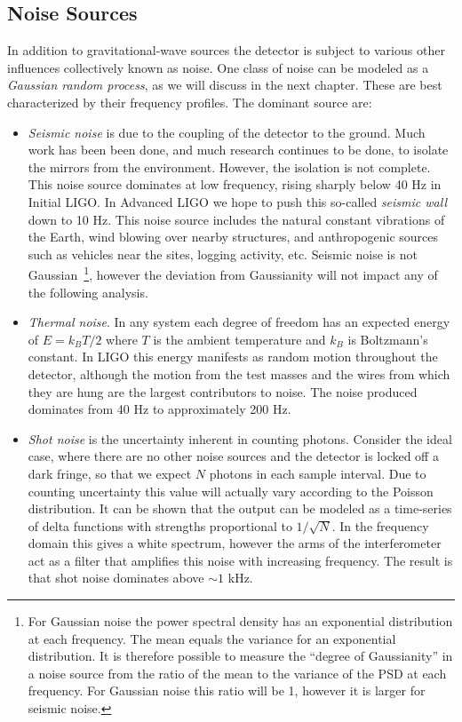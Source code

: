 \subsection{Noise Sources}
\label{sec:noise_sources}

In addition to gravitational-wave sources the detector is subject to
various other influences collectively known as noise.  One class of
noise can be modeled as a \emph{Gaussian random process}, as we will
discuss in the next chapter.  These are best characterized by their
frequency profiles.  The dominant source are:
%
\begin{itemize} \item \emph{Seismic noise} is due to the coupling of
the detector to the ground.  Much work has been been done, and much
research continues to be done, to isolate the mirrors from the
environment.  However, the isolation is not complete.  This noise
source dominates at low frequency, rising sharply below 40 Hz in
Initial LIGO.  In Advanced LIGO we hope to push this so-called
\emph{seismic wall} down to 10 Hz.  This noise source includes the
natural constant vibrations of the Earth, wind blowing over nearby
structures, and anthropogenic sources such as vehicles near the sites,
logging activity, etc.  Seismic noise is not Gaussian~\footnote{For
Gaussian noise the power spectral density has an exponential
distribution at each frequency.  The mean equals the variance for an
exponential distribution.  It is therefore possible to measure the
``degree of Gaussianity'' in a noise source from the ratio of the mean
to the variance of the PSD at each frequency.  For Gaussian noise this
ratio will be 1, however it is larger for seismic noise.}, however the
deviation from Gaussianity will not impact any of the following
analysis.

\item \emph{Thermal noise}. In any system each degree of freedom has
an expected energy of $E=k_B T/2$ where $T$ is the ambient temperature
and $k_B$ is Boltzmann's constant.  In LIGO this energy manifests as
random motion throughout the detector, although the motion from the
test masses and the wires from which they are hung are the largest
contributors to noise.  The noise produced dominates from 40 Hz to
approximately 200 Hz.

\item \emph{Shot noise} is the uncertainty inherent in counting
photons.  Consider the ideal case, where there are no other noise
sources and the detector is locked off a dark fringe, so that we
expect $N$ photons in each sample interval.  Due to counting
uncertainty this value will actually vary according to the Poisson
distribution.  It can be shown that the output can be modeled as a
time-series of delta functions with strengths proportional to
$1/\sqrt{N}$.  In the frequency domain this gives a white spectrum,
however the arms of the interferometer act as a filter that amplifies
this noise with increasing frequency.  The result is that shot noise
dominates above $\sim 1$ kHz.

\end{itemize}
